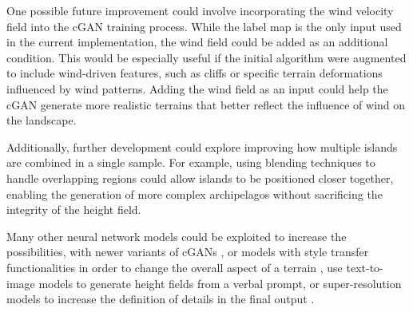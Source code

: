 One possible future improvement could involve incorporating the wind velocity field into the cGAN training process. While the label map is the only input used in the current implementation, the wind field could be added as an additional condition. This would be especially useful if the initial algorithm were augmented to include wind-driven features, such as cliffs or specific terrain deformations influenced by wind patterns. Adding the wind field as an input could help the cGAN generate more realistic terrains that better reflect the influence of wind on the landscape.

Additionally, further development could explore improving how multiple islands are combined in a single sample. For example, using blending techniques to handle overlapping regions could allow islands to be positioned closer together, enabling the generation of more complex archipelagos without sacrificing the integrity of the height field.

Many other neural network models could be exploited to increase the possibilities, with newer variants of cGANs \cite{Park2019}, or models with style transfer functionalities \cite{Gatys2015,Zhu2020} in order to change the overall aspect of a terrain \cite{Perche2023a,Perche2023b}, use text-to-image models \cite{Rombach2021,Radford2021} to generate height fields from a verbal prompt, or super-resolution models \cite{Dong2014} to increase the definition of details in the final output \cite{Guerin2016a}.
